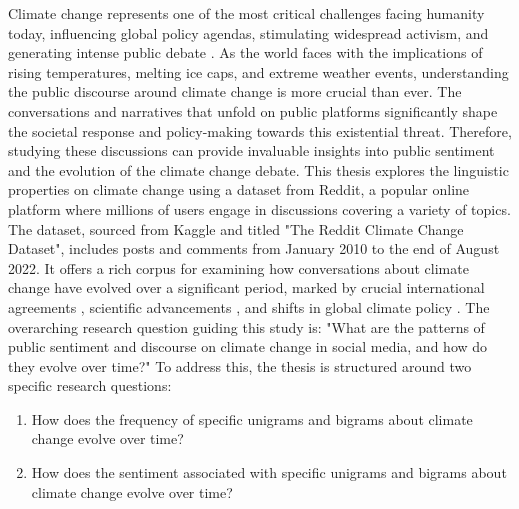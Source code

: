 Climate change represents one of the most critical challenges facing humanity today, influencing global 
policy agendas, stimulating widespread activism, and generating intense public debate \cite{10.1093/oxfordhb/9780199566600.003.0001}. As the world 
faces with the implications of rising temperatures, melting ice caps, and extreme weather events, 
understanding the public discourse around climate change is more crucial than ever. The conversations 
and narratives that unfold on public platforms significantly shape the societal response and 
policy-making towards this existential threat. Therefore, studying these discussions can provide 
invaluable insights into public sentiment and the evolution of the climate change debate.
This thesis explores the linguistic properties on climate change using a dataset from Reddit, a 
popular online platform where millions of users engage in discussions covering a variety of topics. 
The dataset, sourced from Kaggle and titled "The Reddit Climate Change Dataset", includes posts 
and comments from January 2010 to the end of August 2022. It offers a rich corpus for examining how 
conversations about climate change have evolved over a significant period, marked by crucial
international agreements \cite{unfccc2015paris}, scientific advancements \cite{DUSONCHET2015986,RUBIN2015378}, 
and shifts in global climate policy \cite{unep2020emissiongapreport}.
The overarching research question guiding this study is: "What are the patterns of public sentiment 
and discourse on climate change in social media, and how do they evolve over time?" To address this, 
the thesis is structured around two specific research questions:

\begin{enumerate}
    \item How does the frequency of specific unigrams and bigrams about climate change evolve over time?
    \item How does the sentiment associated with specific unigrams and bigrams about climate change evolve over time?
\end{enumerate}

